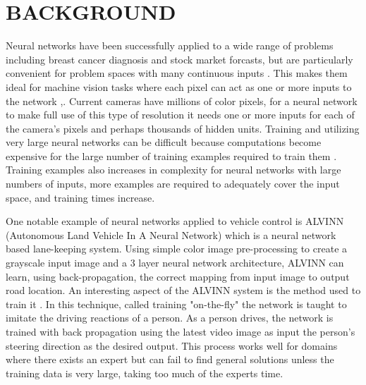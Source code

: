 \documentclass{article}
\begin{document}
	\section{BACKGROUND}

		Neural networks have been successfully applied to a wide range of problems including breast cancer diagnosis and stock market forcasts, but are particularly convenient for problem spaces with many continuous inputs \cite{Cheng1995} \cite{Chen2006}.  This makes them ideal for machine vision tasks where each pixel can act as one or more inputs to the network \cite{Pomerleau93_NNforVehicles},\cite{EgmontPetersen2002imageprocessingNN}.  Current cameras have millions of color pixels, for a neural network to make full use of this type of resolution it needs one or more inputs for each of the camera's pixels and perhaps thousands of hidden units.  Training and utilizing very large neural networks can be difficult because computations become expensive for the large number of training examples required to train them \cite{Giacinto2001}. Training examples also increases in complexity for neural networks with large numbers of inputs, more examples are required to adequately cover the input space, and training times increase. 
		
	One notable example of neural networks applied to vehicle control is ALVINN (Autonomous Land Vehicle In A Neural Network)\cite{Pomerleau93ALVINN} which is a neural network based lane-keeping system. Using simple color image pre-processing to create a grayscale input image and a 3 layer neural network architecture, ALVINN can learn, using back-propagation, the correct mapping from input image to output road location.  An interesting aspect of the ALVINN system is the method used to train it \cite{Pomerleau93_NNforVehicles}.  In this technique, called training "on-the-fly" the network is taught to imitate the driving reactions of a person.  As a person drives, the network is trained with back propagation using the latest video image as input the person's steering direction as the desired output.  This process works well for domains where there exists an expert but can fail to find general solutions unless the training data is very large, taking too much of the experts time.
\end{document}
